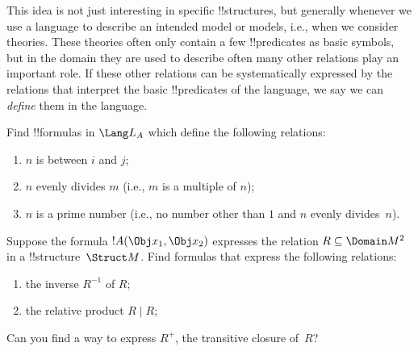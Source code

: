 \documentclass[../../include/open-logic-section]{subfiles}
\begin{document}
This idea is not just interesting in specific !!{structure}s, but
generally whenever we use a language to describe an intended model or
models, i.e., when we consider theories. These theories often only
contain a few !!{predicate}s as basic symbols, but in the domain they
are used to describe often many other relations play an important
role.  If these other relations can be systematically expressed by the
relations that interpret the basic !!{predicate}s of the language, we
say we can \emph{define} them in the language.

\begin{prob}
Find !!{formula}s in $\Lang L_A$ which define the following relations:
\begin{enumerate}
\item $n$ is between $i$ and $j$;
\item $n$ evenly divides $m$ (i.e., $m$ is a multiple of $n$);
\item $n$ is a prime number (i.e., no number other than $1$ and $n$ evenly
  divides~$n$).
\end{enumerate}
\end{prob}

\begin{prob}
Suppose the formula $!A(\Obj x_1, \Obj x_2)$ expresses the relation $R
\subseteq \Domain M^2$ in a !!{structure}~$\Struct M$. Find formulas
that express the following relations:
\begin{enumerate}
\item the inverse $R^{-1}$ of $R$;
\item the relative product $R \mid R$;
\end{enumerate}
Can you find a way to express $R^+$, the transitive closure of~$R$?
\end{prob}
\end{document}
